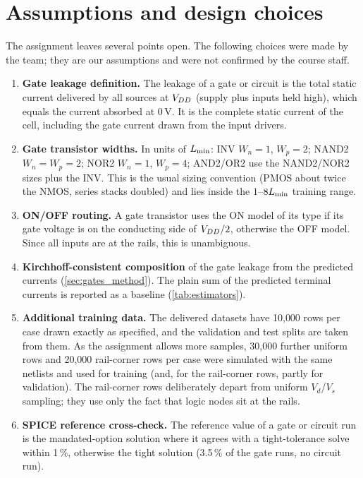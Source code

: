 \section{Assumptions and design choices}\label{app:assumptions}
The assignment leaves several points open. The following choices were made by the team; they are our assumptions and were not confirmed by the
course staff.
\begin{enumerate}
  \item \textbf{Gate leakage definition.} The leakage of a gate or circuit is the total static current delivered by all sources at $V_{DD}$ (supply plus
        inputs held high), which equals the current absorbed at $0$\,V. It is the complete static current of the cell, including the gate current
        drawn from the input drivers.
  \item \textbf{Gate transistor widths.} In units of $L_{\min}$: INV $W_n=1$, $W_p=2$; NAND2 $W_n=W_p=2$; NOR2 $W_n=1$, $W_p=4$; AND2/OR2 use the
        NAND2/NOR2 sizes plus the INV. This is the usual sizing convention (PMOS about twice the NMOS, series stacks doubled) and lies inside the
        $1$--$8L_{\min}$ training range.
  \item \textbf{ON/OFF routing.} A gate transistor uses the ON model of its type if its gate voltage is on the conducting side of $V_{DD}/2$, otherwise
        the OFF model. Since all inputs are at the rails, this is unambiguous.
  \item \textbf{Kirchhoff-consistent composition} of the gate leakage from the predicted currents (\cref{sec:gates_method}). The plain sum of the
        predicted terminal currents is reported as a baseline (\cref{tab:estimators}).
  \item \textbf{Additional training data.} The delivered datasets have 10{,}000 rows per case drawn exactly as specified, and the validation and
        test splits are taken from them. As the assignment allows more samples, 30{,}000 further uniform rows and 20{,}000 rail-corner rows per case
        were simulated with the same netlists and used for training (and, for the rail-corner rows, partly for validation). The rail-corner rows
        deliberately depart from uniform $V_d$/$V_s$ sampling; they use only the fact that logic nodes sit at the rails.
  \item \textbf{SPICE reference cross-check.} The reference value of a gate or circuit run is the mandated-option solution where it agrees with a
        tight-tolerance solve within 1\,\%, otherwise the tight solution (3.5\,\% of the gate runs, no circuit run).

\end{enumerate}
